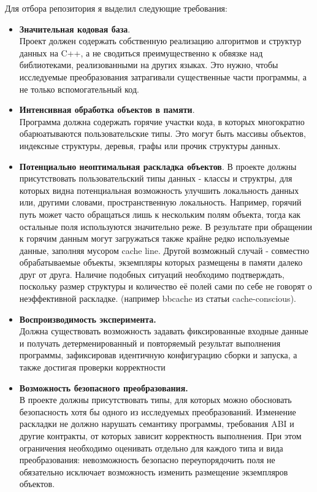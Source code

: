 \documentclass[a4paper,12pt]{article}
\begin{document}
Для отбора репозитория я выделил следующие требования:
\begin{itemize}
    \item \textbf{Значительная кодовая база}.\\ 
        Проект должен содержать собственную реализацию алгоритмов и структур данных на C++,
        а не сводиться преимущественно к обвязке над библиотеками, реализованными на 
        других языках. Это нужно, чтобы исследуемые преобразования затрагивали существенные 
        части программы, а не только вспомогательный код.

    \item \textbf{Интенсивная обработка объектов в памяти}.\\
        Программа должна содержать горячие участки кода, в которых многократно
        обарюатываются пользовательские типы. Это могут быть массивы объектов,
        индексные структуры, деревья, графы или прочик структуры данных. 

    \item \textbf{Потенциально неоптимальная раскладка объектов}. 
        В проекте должны присутствовать пользовательский типы данных - классы и
        структры, для которых видна
        потенциальная возможность улучшить локальность данных или, другими
        словами, пространственную локальность. Например, горячий путь может часто 
        обращаться лишь к нескольким полям объекта, тогда как остальные поля используются 
        значительно реже. В результате при обращении к горячим данным могут загружаться 
        также крайне редко используемые
        данные, заполняя мусором cache line. Другой возможный случай - совместно 
        обрабатываемые объекты, экземпляры 
        которых размещены в памяти далеко друг от друга. Наличие подобных ситуаций 
        необходимо подтверждать, поскольку размер структуры 
        и количество её полей сами по себе не говорят о неэффективной раскладке.
        (например bbcache из статьи cache-conscious).

    \item \textbf{Воспроизводимость эксперимента.}\\
    Должна существовать возможность задавать фиксированные входные данные и
    получать детерменированный и повторяемый результат выполнения программы,
    зафиксировав идентичную конфигурацию сборки и запуска, а также достигая
    проверки корректности

    \item \textbf{Возможность безопасного преобразования.}\\
    В проекте должны присутствовать типы, для которых можно обосновать безопасность хотя бы 
    одного из исследуемых преобразований. Изменение раскладки не должно нарушать семантику 
    программы, требования ABI и другие контракты, от которых зависит корректность 
    выполнения. При этом ограничения необходимо оценивать отдельно для каждого типа и вида 
    преобразования: невозможность безопасно переупорядочить поля не обязательно исключает 
    возможность изменить размещение экземпляров объектов.

\end{itemize}
\end{document}
